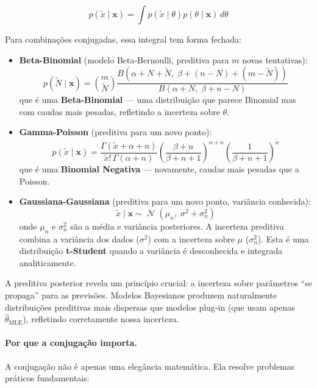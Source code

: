 \documentclass{tufte-handout}
\DeclareMathOperator{\N}{\mathcal{N}}
\begin{document}
\[
p(\tilde{x} \mid \mathbf{x}) = \int p(\tilde{x} \mid \theta) p(\theta \mid \mathbf{x}) \, d\theta
\]

Para combinações conjugadas, essa integral tem forma fechada:

\begin{itemize}
    \item \textbf{Beta-Binomial} (modelo Beta-Bernoulli, preditiva para $m$ novas tentativas):
    \[
    p(\tilde{N} \mid \mathbf{x}) = \binom{m}{\tilde{N}} \frac{B(\alpha + N + \tilde{N},\; \beta + (n-N) + (m-\tilde{N}))}{B(\alpha + N,\; \beta + n - N)}
    \]
    que é uma \textbf{Beta-Binomial} --- uma distribuição que parece Binomial mas com caudas mais pesadas, refletindo a incerteza sobre $\theta$.
    
    \item \textbf{Gamma-Poisson} (preditiva para um novo ponto):
    \[
    p(\tilde{x} \mid \mathbf{x}) = \frac{\Gamma(\tilde{x} + \alpha + n)}{\tilde{x}! \,\Gamma(\alpha + n)} \left(\frac{\beta + n}{\beta + n + 1}\right)^{\alpha + n} \left(\frac{1}{\beta + n + 1}\right)^{\tilde{x}}
    \]
    que é uma \textbf{Binomial Negativa} --- novamente, caudas mais pesadas que a Poisson.
    
    \item \textbf{Gaussiana-Gaussiana} (preditiva para um novo ponto, variância conhecida):
    \[
    \tilde{x} \mid \mathbf{x} \sim \N\!\left(\mu_n,\; \sigma^2 + \sigma_n^2\right)
    \]
    onde $\mu_n$ e $\sigma_n^2$ são a média e variância posteriores. A incerteza preditiva combina a variância dos dados ($\sigma^2$) com a incerteza sobre $\mu$ ($\sigma_n^2$). Esta é uma distribuição \textbf{t-Student} quando a variância é desconhecida e integrada analiticamente.
\end{itemize}

\begin{remark}
    A preditiva posterior revela um princípio crucial: a incerteza sobre parâmetros ``se propaga'' para as previsões. Modelos Bayesianos produzem naturalmente distribuições preditivas mais dispersas que modelos plug-in (que usam apenas $\hat{\theta}_{\text{MLE}}$), refletindo corretamente nossa incerteza.
\end{remark}

\paragraph{Por que a conjugação importa.}

A conjugação não é apenas uma elegância matemática. Ela resolve problemas práticos fundamentais:
\end{document}
